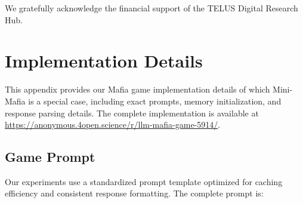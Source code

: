 \documentclass[sigconf]{aamas}
\begin{document}
\begin{acks}
    We gratefully acknowledge the financial support of the TELUS Digital Research Hub.
\end{acks}





\appendix

\section{Implementation Details}
\label{appendix:experimental_details}

This appendix provides our Mafia game implementation details of which Mini-Mafia is a special case, including exact prompts, memory initialization, and response parsing details. The complete implementation is available at \url{https://anonymous.4open.science/r/llm-mafia-game-5914/}.

\subsection{Game Prompt}

Our experiments use a standardized prompt template optimized for caching efficiency and consistent response formatting. The complete prompt is:
\end{document}
